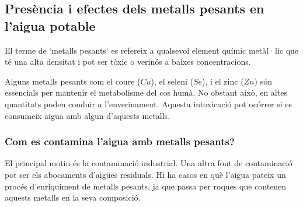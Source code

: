 \subsection{Presència i efectes dels metalls pesants en l’aigua potable} \label{subsec:metallspesats}
El terme de `metalls pesants` es refereix a qualsevol element químic metàl·lic que té una alta densitat i pot ser tòxic o verinós a baixes concentracions.

Alguns metalls pesants com el coure ($Cu$), el seleni ($Se$), i el zinc ($Zn$) són essencials per mantenir el metabolisme del cos humà. No obstant això, en altes quantitats poden conduir a l'enverinament. Aquesta intoxicació pot ocórrer si es consumeix aigua amb algun d’aquests metalls.
\subsubsection{Com es contamina l’aigua amb metalls pesants?}
El principal motiu és la contaminació industrial. Una altra font de contaminació pot ser els abocaments d'aigües residuals. Hi ha casos en què l’aigua pateix un procés d’enriquiment de metalls pesants, ja que passa per roques que contenen aquests metalls en la seva composició.
